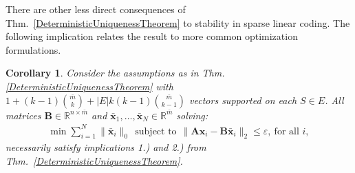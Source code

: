 \documentclass[9pt,twocolumn]{pnas-new}
\newtheorem{corollary}{Corollary}
\begin{document}
There are other less direct consequences of Thm.~\ref{DeterministicUniquenessTheorem} to stability in sparse linear coding.  The following implication relates the result to more common optimization formulations.


\begin{corollary}\label{SLCopt}
Consider the assumptions as in Thm.\ref{DeterministicUniquenessTheorem} with $1 + (k-1){\bar m \choose k} + |E|k(k-1){\bar m \choose k-1}$ vectors supported on each $S \in E$.
All matrices $\mathbf{B} \in \mathbb{R}^{n \times \bar m}$ and $\mathbf{\bar x}_1, \ldots, \mathbf{\bar x}_N \in \mathbb{R}^{\bar m}$ solving:
\begin{align}\label{minsum}
\min \sum_{i = 1}^N \|\mathbf{\bar x}_i\|_0 \ \ 
\text{subject to} \ \ \|\mathbf{A}\mathbf{x}_i - \mathbf{B}\mathbf{\bar x}_i\|_2 \leq \varepsilon, \ \text{for all $i$},
\end{align}
%
necessarily satisfy implications 1.) and 2.) from Thm.~\ref{DeterministicUniquenessTheorem}.
\end{corollary}
\end{document}
